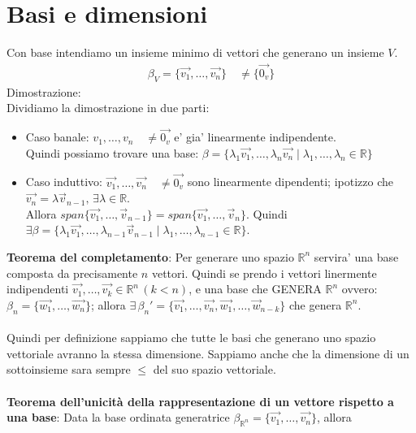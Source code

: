 \documentclass[10pt]{extarticle}
\begin{document}
\section{Basi e dimensioni}
Con base intendiamo un insieme minimo di vettori che generano un insieme $V$.
\begin{align*}
    \beta_{V}=\{\vec{v_1},\dots,\vec{v_n}\} \quad \neq \{\vec{0_v}\}
\end{align*}
Dimostrazione: \\
\vspace{0.5em} Dividiamo la dimostrazione in due parti:
\begin{itemize}
    \item Caso banale: \(v_1,\dots,v_n \quad \neq \vec{0_v}\) e' gia' linearmente indipendente. \\
    Quindi possiamo trovare una base: $\beta=\{\lambda_1\vec{v_1},\dots,\lambda_n\vec{v_n} \mid \lambda_1,\dots,\lambda_n \in \mathbb{R}\}$
    \item Caso induttivo: \(\vec{v_1},\dots,\vec{v_n} \quad \neq \vec{0_v}\) sono linearmente dipendenti; ipotizzo che $\vec{v_n}=\lambda \vec{v}_{n-1}, \, \exists \lambda \in \mathbb{R}$. \\
    Allora $span\{\vec{v_1},\dots,\vec{v}_{n-1}\}=span\{\vec{v_1},\dots,\vec{v}_{n}\}$. Quindi $\exists \beta=\{\lambda_1\vec{v_1},\dots,\lambda_{n-1}\vec{v}_{n-1} \mid \lambda_1,\dots,\lambda_{n-1} \in \mathbb{R}\}$.
\end{itemize}
\textbf{Teorema del completamento}: Per  generare uno spazio $\mathbb{R}^n$ servira' una base composta da precisamente $n$ vettori. Quindi se prendo i vettori linermente indipendenti $\vec{v_1},\dots,\vec{v_k}\in\mathbb{R}^n \, (k<n)$, e una base che GENERA $\mathbb{R}^n$ ovvero: $\beta_n=\{\vec{w_1},\dots,\vec{w_n}\}$; allora $\exists \, \beta_{n}'=\{\vec{v_1},\dots,\vec{v_n},\vec{w_1},\dots,\vec{w}_{n-k}\}$ che genera $\mathbb{R}^n$.\\
\vspace{1em}\\ Quindi per definizione sappiamo che tutte le basi che generano uno spazio vettoriale avranno la stessa dimensione. Sappiamo anche che la dimensione di un sottoinsieme sara sempre $\leq$ del suo spazio vettoriale. \\
\vspace{1em}\\\textbf{Teorema dell'unicità della rappresentazione di un vettore rispetto a una base}: Data la base ordinata generatrice $\beta_{\mathbb{R}^n}=\{\vec{v_1},\dots,\vec{v_n}\}$, allora 
\end{document}
